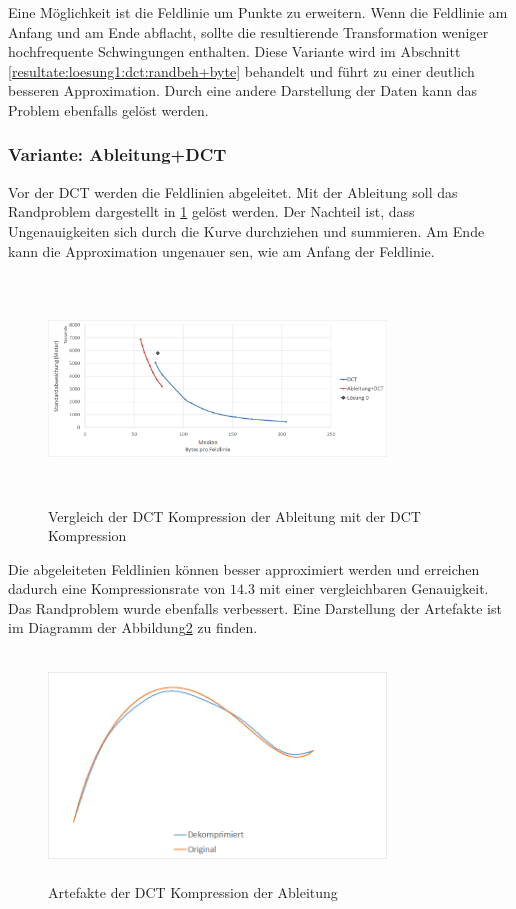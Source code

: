 Eine Möglichkeit ist die Feldlinie um Punkte zu erweitern. Wenn die Feldlinie am Anfang und am Ende abflacht, sollte die resultierende Transformation weniger hochfrequente Schwingungen enthalten. Diese Variante wird im Abschnitt \ref{resultate:loesung1:dct:randbeh+byte} behandelt und führt zu einer deutlich besseren Approximation. Durch eine andere Darstellung der Daten kann das Problem ebenfalls gelöst werden.

\subsubsection{Variante: Ableitung+DCT}\label{resultate:dct:ableitung_dct}
Vor der DCT werden die Feldlinien abgeleitet. Mit der Ableitung soll das Randproblem dargestellt in \ref{resultate:loesung1:dct:artefakte} gelöst werden. Der Nachteil ist, dass Ungenauigkeiten sich durch die Kurve durchziehen und summieren. Am Ende kann die Approximation ungenauer sen, wie am Anfang der Feldlinie.\\
\begin{figure}[!htbp]
	\center
	\includegraphics[width=0.8\textwidth,height=6cm,keepaspectratio]{./pictures/resultate/loesung1/loesung1-1/loesung1_1.png}
	\caption{Vergleich der DCT Kompression der Ableitung mit der DCT Kompression}
	\label{resultate:loesung1:dct:artefakte}
\end{figure}
Die abgeleiteten Feldlinien können besser approximiert werden und erreichen dadurch eine Kompressionsrate von $14.3$ mit einer vergleichbaren Genauigkeit. Das Randproblem wurde ebenfalls verbessert. Eine Darstellung der Artefakte ist im Diagramm der Abbildung\ref{resultate:loesung1:dct:byte:artefakte} zu finden.\\
\begin{figure}[!htbp]
	\center
	\includegraphics[width=0.8\textwidth,height=6cm,keepaspectratio]{./pictures/resultate/loesung1/loesung1-6/artefakte.png}
	\caption{Artefakte der DCT Kompression der Ableitung}
	\label{resultate:loesung1:dct:byte:artefakte}
\end{figure} 
